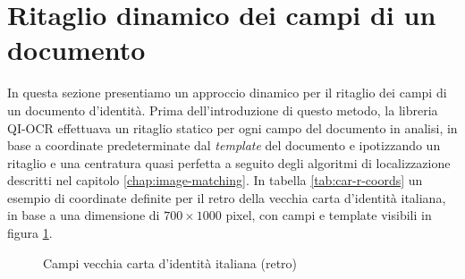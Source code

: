 \section{Ritaglio dinamico dei campi di un documento}
In questa sezione presentiamo un approccio dinamico per il ritaglio dei campi di un documento d'identit\`a. Prima dell'introduzione di questo metodo, la libreria QI-OCR effettuava un ritaglio statico per ogni campo del documento in analisi, in base a coordinate predeterminate dal \textit{template} del documento e ipotizzando un ritaglio e una centratura quasi perfetta a seguito degli algoritmi di localizzazione descritti nel capitolo \ref{chap:image-matching}. In tabella \ref{tab:car-r-coords} un esempio di coordinate definite per il retro della vecchia carta d'identit\`a italiana, in base a una dimensione di $700 \times 1000$ pixel, con campi e template visibili in figura \ref{fig:car-r-template}.\par
\begin{figure}[h]
	\centering
	\caption{Campi vecchia carta d'identit\`a italiana (retro)} \label{fig:car-r-template}
\end{figure}
